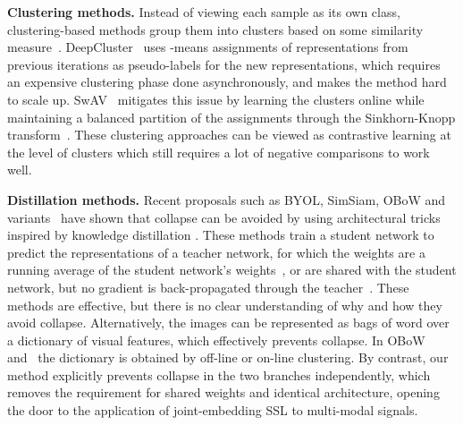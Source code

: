 \documentclass{article}
\begin{document}
\vspace{2mm}
\textbf{Clustering methods.} Instead of viewing each sample as its own class, clustering-based methods group them into clusters based on some similarity measure~\cite{caron2020swav, caron2018clustering, bautista2016cliquecnn, yang2016joint, xie2016clustering, huang2019neighbourhood, zhuang2019local, caron2019noncurated, asano2020labelling, yan2020clusterfit}. DeepCluster~\cite{caron2018clustering} uses -means assignments of representations from previous iterations as pseudo-labels for the new representations, which requires an expensive clustering phase done asynchronously, and makes the method hard to scale up. SwAV~\cite{caron2020swav} mitigates this issue by learning the clusters online while maintaining a balanced partition of the assignments through the Sinkhorn-Knopp transform~\cite{cuturi2013sinkhorn}. These clustering approaches can be viewed as contrastive learning at the level of clusters which still requires a lot of negative comparisons to work well. 

\vspace{2mm}
\noindent \textbf{Distillation methods.} Recent proposals such as BYOL, SimSiam, OBoW and variants~\cite{grill2020byol, chen2020simsiam, gidaris2021obow, richemond2020byolworks, gidaris2020bags} have shown that collapse can be avoided by using architectural tricks inspired by knowledge distillation \cite{hinton2015distillation}. These methods train a student network to predict the representations of a teacher network, for which the weights are a running average of the student network's weights~\cite{grill2020byol}, or are shared with the student network, but no gradient is back-propagated through the teacher~\cite{chen2020simsiam}. These methods are effective, but there is no clear understanding of why and how they avoid collapse. Alternatively, the images can be represented as bags of word over a dictionary of visual features, which effectively prevents collapse. In OBoW~\cite{gidaris2020bags} and~\cite{gidaris2021obow} the dictionary is obtained by off-line or on-line clustering. By contrast, our method explicitly prevents collapse in the two branches independently, which removes the requirement for shared weights and identical architecture, opening the door to the application of joint-embedding SSL to multi-modal signals.
\end{document}
